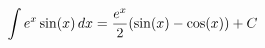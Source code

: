 \documentclass[preview]{standalone}
\begin{document}
\begin{align*}
\special{dvisvgm:raw <g id='unique000'>}\int e^x \sin(x) \, dx = \frac{e^x}{2} (\sin(x) - \cos(x)) + C\special{dvisvgm:raw </g>}
\end{align*}
\end{document}
